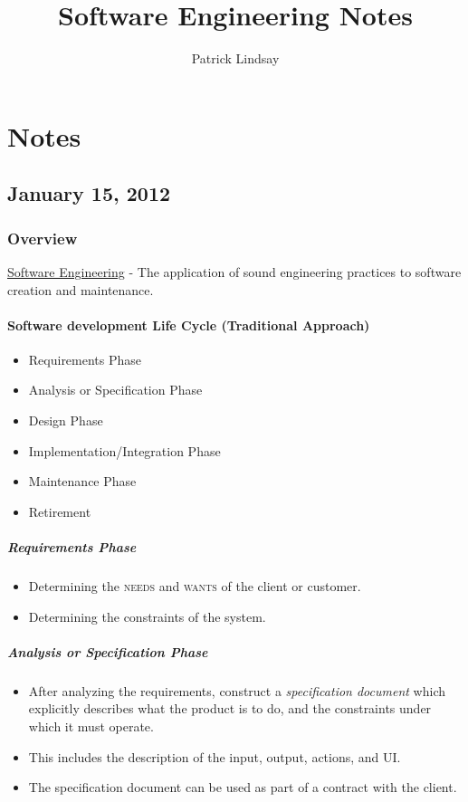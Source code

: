 \documentclass{report}
\author{Patrick Lindsay}
\title{Software Engineering Notes}
\begin{document}
\maketitle
\tableofcontents
\newpage
\part{Notes}
\chapter{January 15, 2012}
	\section{Overview}
	\underline{Software Engineering} - The application of sound engineering practices to software creation and maintenance.
		\subsection{Software development Life Cycle (Traditional Approach)}
			\begin{itemize}
				\item Requirements Phase
				\item Analysis or Specification Phase
				\item Design Phase
				\item Implementation/Integration Phase
				\item Maintenance Phase
				\item Retirement
			\end{itemize}
		\subsubsection{Requirements Phase}
			\begin{itemize}
				\item Determining the \textsc{needs} and \textsc{wants} of the client or customer.
				\item Determining the constraints of the system.
			\end{itemize}
		\subsubsection{Analysis or Specification Phase}
			\begin{itemize}
				\item After analyzing the requirements, construct a \emph{specification document} which explicitly describes what the product is to do, and the constraints under which it must operate.
				\item This includes the description of the input, output, actions, and UI.
				\item The specification document can be used as part of a contract with the client.
			\end{itemize}
\end{document}
